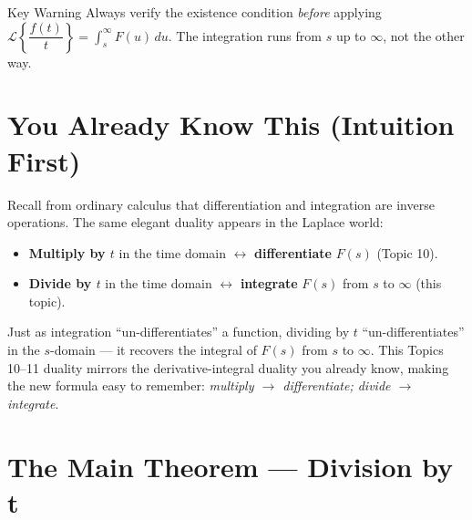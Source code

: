 \documentclass[12pt,a4paper]{article}
\begin{document}
\begin{learnbox}{Key Warning}
Always verify the existence condition \emph{before} applying
$\mathcal{L}\!\left\{\dfrac{f(t)}{t}\right\} = \int_s^\infty F(u)\,du$.
The integration runs from $s$ up to $\infty$, not the other way.
\end{learnbox}

\section{You Already Know This (Intuition First)}

Recall from ordinary calculus that differentiation and integration are
inverse operations. The same elegant duality appears in the Laplace world:
\begin{itemize}[leftmargin=2em]
  \item \textbf{Multiply by $t$} in the time domain $\longleftrightarrow$
        \textbf{differentiate} $F(s)$ (Topic 10).
  \item \textbf{Divide by $t$} in the time domain $\longleftrightarrow$
        \textbf{integrate} $F(s)$ from $s$ to $\infty$ (this topic).
\end{itemize}

Just as integration ``un-differentiates'' a function, dividing by $t$
``un-differentiates'' in the $s$-domain --- it recovers the integral of $F(s)$
from $s$ to $\infty$. This Topics 10--11 duality mirrors the derivative-integral
duality you already know, making the new formula easy to remember:
\emph{multiply $\to$ differentiate; divide $\to$ integrate}.

\section{The Main Theorem --- Division by t}
\end{document}
